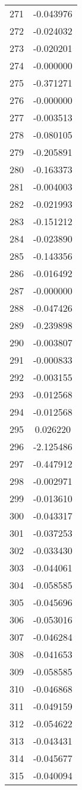 \documentclass[12pt]{article}
\begin{document}
\begin{longtable}{@{}cc@{}}
271 & -0.043976 \\
272 & -0.024032 \\
273 & -0.020201 \\
274 & -0.000000 \\
275 & -0.371271 \\
276 & -0.000000 \\
277 & -0.003513 \\
278 & -0.080105 \\
279 & -0.205891 \\
280 & -0.163373 \\
281 & -0.004003 \\
282 & -0.021993 \\
283 & -0.151212 \\
284 & -0.023890 \\
285 & -0.143356 \\
286 & -0.016492 \\
287 & -0.000000 \\
288 & -0.047426 \\
289 & -0.239898 \\
290 & -0.003807 \\
291 & -0.000833 \\
292 & -0.003155 \\
293 & -0.012568 \\
294 & -0.012568 \\
295 & 0.026220 \\
296 & -2.125486 \\
297 & -0.447912 \\
298 & -0.002971 \\
299 & -0.013610 \\
300 & -0.043317 \\
301 & -0.037253 \\
302 & -0.033430 \\
303 & -0.044061 \\
304 & -0.058585 \\
305 & -0.045696 \\
306 & -0.053016 \\
307 & -0.046284 \\
308 & -0.041653 \\
309 & -0.058585 \\
310 & -0.046868 \\
311 & -0.049159 \\
312 & -0.054622 \\
313 & -0.043431 \\
314 & -0.045677 \\
315 & -0.040094 \\

\end{longtable}
\end{document}
